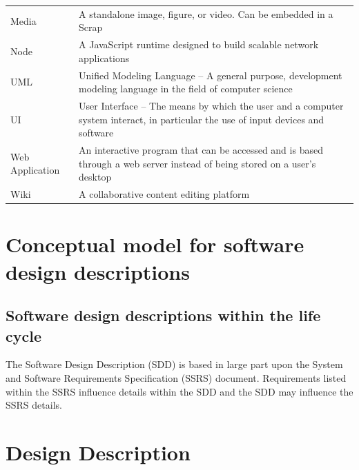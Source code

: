 \documentclass[letterpaper, 10pt, draftclsnofoot, compsoc, onecolumn]{IEEEtran}
\begin{document}
\begin{center}
\begin{supertabular}{p{3cm}p{12cm}}
Media & A standalone image, figure, or video. Can be embedded in a Scrap\\

Node & A JavaScript runtime designed to build scalable network applications\\

UML & Unified Modeling Language -- A general purpose, development modeling language in the field of computer science\\

UI  & User Interface -- The means by which the user and a computer system interact,
	in particular the use of input devices and software\\

Web Application & An interactive program that can be accessed and is based through a web server instead of
being stored on a user's desktop\\

Wiki & A collaborative content editing platform \\
\end{supertabular}

\end{center}



\section{Conceptual model for software design descriptions}



\subsection{Software design descriptions within the life cycle}
{\noindent The Software Design Description (SDD) is based in large part upon
the System and Software Requirements Specification (SSRS) document.
Requirements listed within the SSRS influence details within the SDD and
the SDD may influence the SSRS details.\par}


\section{Design Description}
{\noindent \par}
\end{document}
